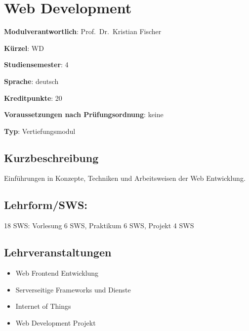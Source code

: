 \chapter{Web Development}\label{web-development}

\begin{modulHead}
\textbf{Modulverantwortlich}: Prof.~Dr.~Kristian
Fischer
\end{modulHead}
\begin{modulHead}
\textbf{Kürzel}:
WD
\end{modulHead}
\begin{modulHead}
\textbf{Studiensemester}:
4
\end{modulHead}
\begin{modulHead}
\textbf{Sprache}:
deutsch
\end{modulHead}
\begin{modulHead}
\textbf{Kreditpunkte}:
20
\end{modulHead}
\begin{modulHead}
\textbf{Voraussetzungen nach
Prüfungsordnung}: keine
\end{modulHead}
\begin{modulHead}
\textbf{Typ}:
Vertiefungsmodul
\end{modulHead}


\section*{Kurzbeschreibung}\label{kurzbeschreibung-6}

Einführungen in Konzepte, Techniken und Arbeitsweisen der Web
Entwicklung.

\section*{Lehrform/SWS:}\label{lehrformsws-26}

18 SWS: Vorlesung 6 SWS, Praktikum 6 SWS, Projekt 4 SWS

\section*{Lehrveranstaltungen}\label{lehrveranstaltungen-1}

\begin{itemize}
\tightlist
\item
  Web Frontend Entwicklung
\item
  Serverseitige Frameworks und Dienste
\item
  Internet of Things
\item
  Web Development Projekt
\end{itemize}

